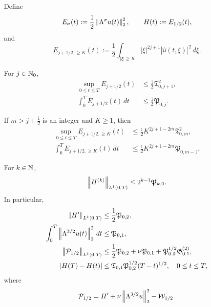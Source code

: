 \begin{proposition}
\label{prop:qc-critical-height}
Define
\[
 E_\sigma(t):=\frac12\left\lVert \Lambda^\sigma u(t)\right\rVert_2^2,
 \qquad
 H(t):=E_{1/2}(t),
\]
and
\[
 E_{j+1/2,\ge K}(t)
 :=\frac12\int_{|\xi|\ge K}|\xi|^{2j+1}
 |\widehat u(t,\xi)|^2\,d\xi.
\]
\begin{samepage}
For \(j\in\mathbb N_0\),
\begin{align}
 \sup_{0\le t\le T}E_{j+1/2}(t)
 &\le\frac12\mathfrak T_{0,j+1}^2,
 \label{eq:qc-critical-sup}\\
 \int_0^T E_{j+1/2}(t)\,dt
 &\le\frac12\mathfrak P_{0,j}.
 \label{eq:qc-critical-mass}
\end{align}
\end{samepage}
If \(m>j+\frac12\) is an integer and \(K\ge1\), then
\begin{align}
 \sup_{0\le t\le T}E_{j+1/2,\ge K}(t)
 &\le\frac12K^{2j+1-2m}\mathfrak T_{0,m}^2,
 \label{eq:qc-critical-tail-sup}\\
 \int_0^T E_{j+1/2,\ge K}(t)\,dt
 &\le\frac12K^{2j+1-2m}\mathfrak P_{0,m-1}.
 \label{eq:qc-critical-tail-mass}
\end{align}
\begin{samepage}
For \(k\in\mathbb N\),
\begin{equation}
 \left\lVert H^{(k)}\right\rVert_{L^1(0,T)}
 \le2^{k-1}\mathfrak P_{k,0}.
 \label{eq:qc-height-derivatives}
\end{equation}
In particular,
\begin{align}
 \left\lVert H'\right\rVert_{L^1(0,T)}
 &\le\frac12\mathfrak P_{0,2},
 \label{eq:qc-critical-variation}\\
 \int_0^T\left\lVert \Lambda^{3/2}u(t)\right\rVert_2^2\,dt
 &\le\mathfrak P_{0,1},
 \label{eq:qc-critical-dissipation}\\
 \left\lVert \mathcal P_{1/2}\right\rVert_{L^1(0,T)}
 &\le\frac12\mathfrak P_{0,2}+\nu\mathfrak P_{0,1}
 +\mathfrak P_{0,0}^{1/2}\mathfrak G^{(2)}_{0,1},
 \label{eq:qc-critical-current}\\
 |H(T)-H(t)|
 &\le
 \mathfrak T_{0,1}\mathfrak P_{0,2}^{1/2}(T-t)^{1/2},
 \quad0\le t\le T,
 \label{eq:qc-critical-endpoint-modulus}
\end{align}
where
\[
 \mathcal P_{1/2}
 =H'+\nu\left\lVert \Lambda^{3/2}u\right\rVert_2^2-\mathcal W_{1/2}.
\]
\par
\end{samepage}
\end{proposition}


